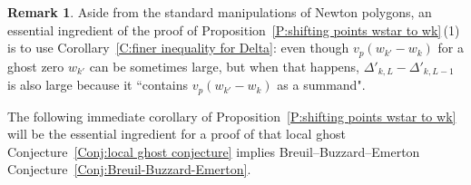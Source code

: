 \documentclass[12pt]{amsart}
\theoremstyle{definition}
\newtheorem{remark}[subsection]{Remark}
\numberwithin{equation}{subsection}
\begin{document}
\begin{remark}
Aside from the standard manipulations of Newton polygons, an essential ingredient of the proof of Proposition~\ref{P:shifting points wstar to wk}\,(1) is to use Corollary~\ref{C:finer inequality for Delta}: even though $v_p(w_{k'}-w_k)$ for a ghost zero $w_{k'}$ can be sometimes large, but when that happens, $\Delta'_{k, L} - \Delta'_{k, L-1}$ is also large because it ``contains $v_p(w_{k'}-w_k)$ as a summand".
\end{remark}



The following immediate corollary of Proposition~\ref{P:shifting points wstar to wk} will be the essential ingredient for a proof of that local ghost Conjecture~\ref{Conj:local ghost conjecture} implies Breuil--Buzzard--Emerton Conjecture~\ref{Conj:Breuil-Buzzard-Emerton}.
\end{document}
